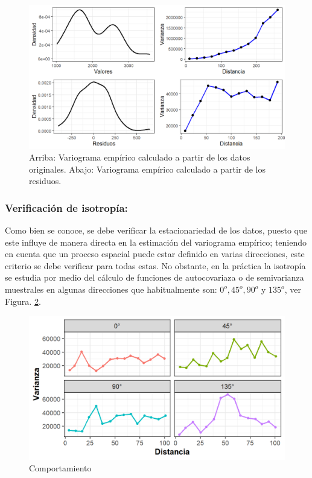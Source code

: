 \documentclass[
]{book}
\begin{document}
\begin{figure}
\includegraphics[width=17.78in]{figuras/otros/den_var} \caption{Arriba: Variograma empírico calculado a partir de los datos originales. Abajo: Variograma empírico calculado a partir de los residuos.}\label{fig:denvar}
\end{figure}

\hypertarget{verificaciuxf3n-de-isotropuxeda}{%
\subsubsection*{Verificación de isotropía:}\label{verificaciuxf3n-de-isotropuxeda}}

Como bien se conoce, se debe verificar la estacionariedad de los datos, puesto que este influye de manera directa en la estimación del variograma empírico; teniendo en cuenta que un proceso espacial puede estar definido en varias direcciones, este criterio se debe verificar para todas estas. No obstante, en la práctica la isotropía se estudia por medio del cálculo de funciones de autocovariaza o de semivarianza muestrales en algunas direcciones que habitualmente son: \(0^o,45^o, 90^o\) y \(135^o\), ver Figura. \ref{fig:isodir}.

\begin{figure}
\includegraphics[width=17.78in]{figuras/otros/iso_dir} \caption{Comportamiento}\label{fig:isodir}
\end{figure}
\end{document}

